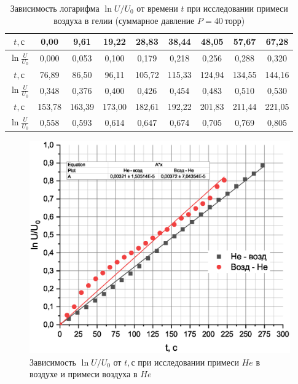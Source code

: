\documentclass[a4paper,12pt]{article}
\theoremstyle{plain} %
\theoremstyle{definition} %
\theoremstyle{remark} %
\begin{document}
\begin{table}[H]
	\begin{center}

	\begin{tabular}{|c|c|c|c|c|c|c|c|c|}
		\hline
		$t, \text{с}$ & 0,00  & 9,61  & 19,22 & 28,83 & 38,44 & 48,05 & 57,67 & 67,28   \\ \hline
		\rule{0cm}{3ex}
		$\ln \frac{U}{U_0}$& 0,000 & 0,053 & 0,100 & 0,179 & 0,218 & 0,256 & 0,288 & 0,320    \\ [1ex]\hline \hline
		$t, \text{с}$& 76,89 & 86,50 & 96,11 & 105,72 & 115,33 & 124,94 & 134,55 & 144,16   \\ \hline
		\rule{0cm}{3ex}
		$\ln \frac{U}{U_0}$& 0,348  & 0,376 & 0,400 & 0,426  & 0,454  & 0,483  & 0,510  & 0,530    \\[1ex] \hline \hline
		$t, \text{с}$ & 153,78 & 163,39 &173,00 & 182,61 & 192,22 & 201,83 & 211,44 & 221,05 \\ \hline
		\rule{0cm}{3ex}
		$\ln \frac{U}{U_0}$& 0,558  & 0,593 &0,614  & 0,647  & 0,674  & 0,705  & 0,769  & 0,805  \\[1ex]  \hline
	\end{tabular}
\end{center}
\caption{Зависимость логарифма $\ln U/U_0$ от времени $t$ при исследовании примеси воздуха в гелии (суммарное давление $P = 40\ \text{торр}$)}
\end{table}

\begin{figure}[H]
	\begin{center}
		\includegraphics[width=\linewidth]{8}
	\end{center}
\caption{Зависимость $\ln U/U_0$ от $t, \text{с}$ при исследовании примеси $He$ в воздухе и примеси воздуха в $He$ }
\end{figure}
\end{document}
